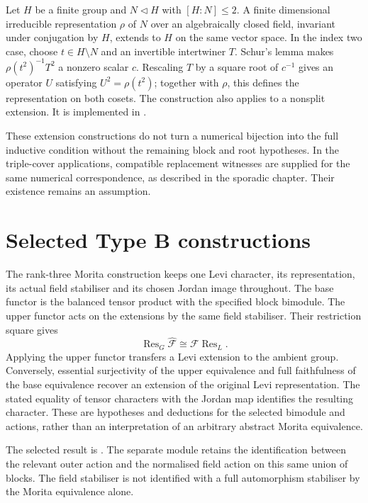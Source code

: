 Let $H$ be a finite group and $N\lhd H$ with $[H:N]\leq 2$.
A finite dimensional irreducible representation $\rho$ of $N$ over an
algebraically closed field, invariant under conjugation by $H$, extends
to $H$ on the same vector space. In the index two case, choose
$t\in H\setminus N$ and an invertible
intertwiner $T$. Schur's lemma makes
$\rho(t^2)^{-1}T^2$ a nonzero scalar $c$. Rescaling $T$ by a square
root of $c^{-1}$ gives an operator $U$ satisfying
$U^2=\rho(t^2)$; together with $\rho$, this defines the representation
on both cosets. The construction also applies to a nonsplit extension.
It is implemented in
.

These extension constructions do not turn a numerical bijection into
the full inductive condition without the remaining block and root
hypotheses. In the triple-cover applications, compatible replacement
witnesses are supplied for the same numerical correspondence, as
described in the sporadic chapter. Their existence remains an assumption.

\section{Selected Type B constructions}

The rank-three Morita construction keeps one Levi character, its
representation, its actual field stabiliser and its chosen Jordan
image throughout. The base functor is the balanced tensor product
with the specified block bimodule. The upper functor acts on the
extensions by the same field stabiliser. Their restriction square
gives
\[
 \operatorname{Res}_G\widehat{\mathcal F}
 \cong\mathcal F\operatorname{Res}_L.
\]
Applying the upper functor transfers a Levi extension to the ambient
group. Conversely, essential surjectivity of the upper equivalence
and full faithfulness of the base equivalence recover an extension
of the original Levi representation. The stated equality of tensor
characters with the Jordan map identifies the resulting character.
These are hypotheses and deductions for the selected bimodule and
actions, rather than an interpretation of an arbitrary abstract
Morita equivalence.

\begin{implementation}
The selected result is
.
The separate module
retains the identification between the relevant outer action and the
normalised field action on this same union of blocks. The field
stabiliser is not identified with a full automorphism stabiliser by
the Morita equivalence alone.
\end{implementation}

